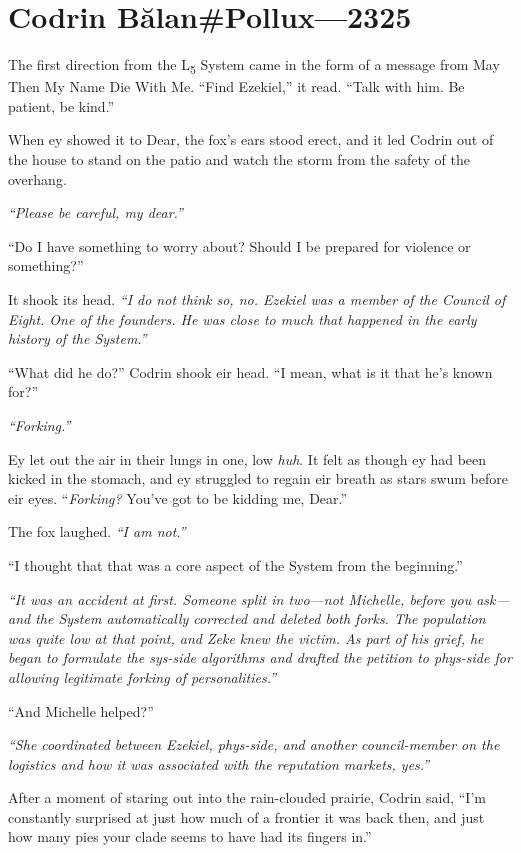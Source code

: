 \hypertarget{codrin-bux103lanpollux-2325}{%
\chapter{Codrin Bălan\#Pollux—2325}\label{codrin-bux103lanpollux-2325}}

The first direction from the L\textsubscript{5} System came in the form of a message from May Then My Name Die With Me. ``Find Ezekiel,'' it read. ``Talk with him. Be patient, be kind.''

When ey showed it to Dear, the fox's ears stood erect, and it led Codrin out of the house to stand on the patio and watch the storm from the safety of the overhang.

\emph{``Please be careful, my dear.''}

``Do I have something to worry about? Should I be prepared for violence or something?''

It shook its head. \emph{``I do not think so, no. Ezekiel was a member of the Council of Eight. One of the founders. He was close to much that happened in the early history of the System.''}

``What did he do?'' Codrin shook eir head. ``I mean, what is it that he's known for?''

\emph{``Forking.''}

Ey let out the air in their lungs in one, low \emph{huh}. It felt as though ey had been kicked in the stomach, and ey struggled to regain eir breath as stars swum before eir eyes. ``\emph{Forking?} You've got to be kidding me, Dear.''

The fox laughed. \emph{``I am not.''}

``I thought that that was a core aspect of the System from the beginning.''

\emph{``It was an accident at first. Someone split in two---not Michelle, before you ask---and the System automatically corrected and deleted both forks. The population was quite low at that point, and Zeke knew the victim. As part of his grief, he began to formulate the sys-side algorithms and drafted the petition to phys-side for allowing legitimate forking of personalities.''}

``And Michelle helped?''

\emph{``She coordinated between Ezekiel, phys-side, and another council-member on the logistics and how it was associated with the reputation markets, yes.''}

After a moment of staring out into the rain-clouded prairie, Codrin said, ``I'm constantly surprised at just how much of a frontier it was back then, and just how many pies your clade seems to have had its fingers in.''

